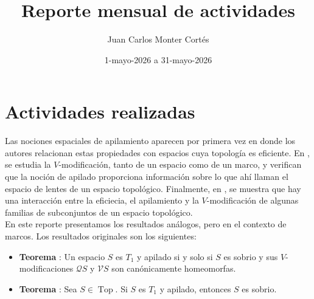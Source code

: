 \documentclass[12pt]{article}
\title{Reporte mensual de actividades}
\date{1-mayo-2026 a 31-mayo-2026}
\author{Juan Carlos Monter Cortés}
\DeclareMathOperator{\Top}{Top}
\begin{document}
\maketitle

\section{Actividades realizadas}

Las nociones espaciales de apilamiento aparecen por primera vez en \cite{sexton2003point} donde los autores relacionan estas propiedades con espacios cuya topología es eficiente.
En \cite{simmons2004vietoris}, se estudia la $V$-modificación, tanto de un espacio como de un marco, y verifican que la noción de apilado proporciona información sobre lo que ahí llaman
el espacio de lentes de un espacio topológico. Finalmente, en \cite{sexton2006ordinal}, se muestra que hay una interacción entre la eficiecia, el apilamiento y la $V$-modificación de algunas 
familias de subconjuntos de un espacio topológico.\\

En este reporte presentamos los resultados análogos, pero en el contexto de marcos. Los resultados originales son los siguientes:
\begin{itemize}
\item \textbf{Teorema} \cite[7.4]{sexton2006ordinal}:
Un espacio $S$ es $T_1$ y apilado si y solo si $S$ es sobrio y sus $V$-modificaciones $\mathcal{Q}S$ y $\mathcal{V}S$ son canónicamente homeomorfas.

\item \textbf{Teorema} \cite[6.2]{sexton2006ordinal}:
  Sea $S\in \Top$. Si $S$ es $T_1$ y apilado, entonces $S$ es sobrio.
\end{itemize}
\end{document}
